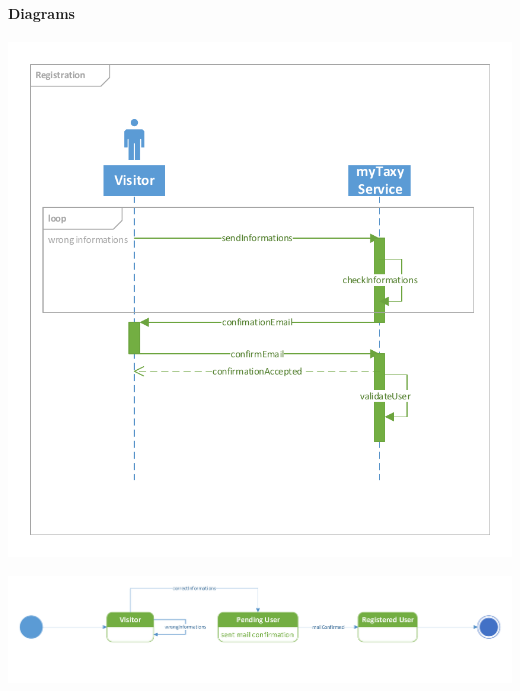 \paragraph{Diagrams}
	\begin{center}
		\includegraphics[width=\textwidth]{diagrams/registration}
		
	\end{center}
	\begin{center}
		\includegraphics[width=\textwidth]{diagrams/registration_state}
	\end{center}


